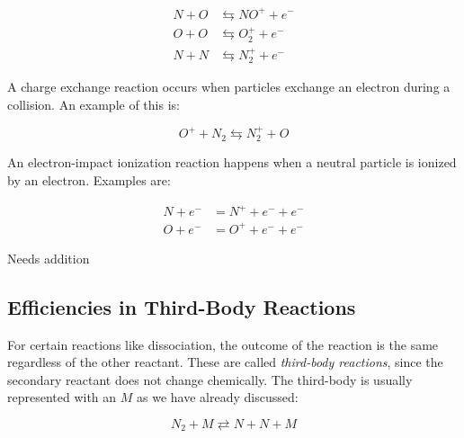 \documentclass[10pt]{article}
\begin{document}
\begin{flushleft}
\begin{definition}
    \begin{subequations}
    \begin{align}
        N + O &\leftrightarrows NO^+ + e^- \\
        O + O &\leftrightarrows O_2^+ + e^- \\
        N + N &\leftrightarrows N_2^+ + e^- 
    \end{align}
    \end{subequations}
\end{definition}

\begin{definition} 
    A charge exchange reaction occurs when particles exchange an electron during a collision. An example of this is:

    \begin{equation}
        O^+ + N_2 \leftrightarrows N_2^+ + O
    \end{equation}
\end{definition}

\begin{definition}
    An electron-impact ionization reaction happens when a neutral particle is ionized by an electron. Examples are:

    \begin{equation}
        \begin{aligned}
        N + e^- &= N^+ + e^- + e^- \\
        O + e^- &= O^+ + e^- + e^-
        \end{aligned}
        \label{def:el-imp-ion-reac}
    \end{equation}    
\end{definition}

\begin{definition}
    Needs addition
\end{definition}

\subsection{Efficiencies in Third-Body Reactions}
For certain reactions like dissociation, the outcome of the reaction is the same regardless of the other reactant. These are called \textit{third-body reactions}, since the secondary reactant does not change chemically. The third-body is usually represented with an $M$ as we have already discussed:

\begin{equation}
    N_2 + M \rightleftarrows N + N + M \label{thirdbody}
\end{equation}


\end{flushleft}
\end{document}
